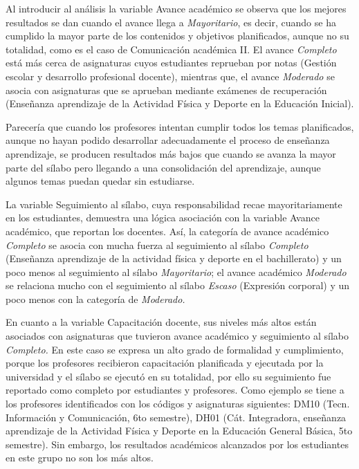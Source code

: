 \documentclass[mathematics,article,submit,moreauthors,pdftex]{mdpi}
\begin{document}
Al introducir al análisis la variable Avance académico se observa que
los mejores resultados se dan cuando el avance llega a
\emph{Mayoritario}, es decir, cuando se ha cumplido la mayor parte de
los contenidos y objetivos planificados, aunque no su totalidad, como es
el caso de Comunicación académica II. El avance \emph{Completo} está más
cerca de asignaturas cuyos estudiantes reprueban por notas (Gestión
escolar y desarrollo profesional docente), mientras que, el avance
\emph{Moderado} se asocia con asignaturas que se aprueban mediante
exámenes de recuperación (Enseñanza aprendizaje de la Actividad Física y
Deporte en la Educación Inicial).

Parecería que cuando los profesores intentan cumplir todos los temas
planificados, aunque no hayan podido desarrollar adecuadamente el
proceso de enseñanza aprendizaje, se producen resultados más bajos que
cuando se avanza la mayor parte del sílabo pero llegando a una
consolidación del aprendizaje, aunque algunos temas puedan quedar sin
estudiarse.

La variable Seguimiento al sílabo, cuya responsabilidad recae
mayoritariamente en los estudiantes, demuestra una lógica asociación con
la variable Avance académico, que reportan los docentes. Así, la
categoría de avance académico \emph{Completo} se asocia con mucha fuerza
al seguimiento al sílabo \emph{Completo} (Enseñanza aprendizaje de la
actividad física y deporte en el bachillerato) y un poco menos al
seguimiento al sílabo \emph{Mayoritario}; el avance académico
\emph{Moderado} se relaciona mucho con el seguimiento al sílabo
\emph{Escaso} (Expresión corporal) y un poco menos con la categoría de
\emph{Moderado.}

En cuanto a la variable Capacitación docente, sus niveles más altos
están asociados con asignaturas que tuvieron avance académico y
seguimiento al sílabo \emph{Completo.} En este caso se expresa un alto
grado de formalidad y cumplimiento, porque los profesores recibieron
capacitación planificada y ejecutada por la universidad y el sílabo se
ejecutó en su totalidad, por ello su seguimiento fue reportado como
completo por estudiantes y profesores. Como ejemplo se tiene a los
profesores identificados con los códigos y asignaturas siguientes: DM10
(Tecn. Información y Comunicación, 6to semestre), DH01 (Cát.
Integradora, enseñanza aprendizaje de la Actividad Física y Deporte en
la Educación General Básica, 5to semestre). Sin embargo, los resultados
académicos alcanzados por los estudiantes en este grupo no son los más
altos.
\end{document}
